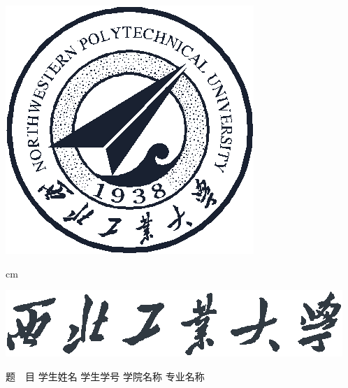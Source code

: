 \documentclass[a4paper,11pt]{ctexart}
\theoremstyle{break}
\theoremstyle{plain}
\begin{document}

\graphicspath{{result_figure/}}	
	
%
%
\begin{titlepage}
	\voffset 2.0cm
	\begin{center}
		\begin{center}
			\begin{minipage}[c]{2.64cm}
				\centering
				\includegraphics[width=1.64 cm]{logo1.png}
			\end{minipage}
			 cm
			\begin{minipage}[c]{8cm}
				\includegraphics[scale=0.6]{logo2.png}
			\end{minipage}
		\end{center}
		\vskip 0.8cm
		\chuhao{}
		\vskip 3cm
		{
			\sanhao\hei 题~~目 \hspace{0.2cm}
		}
		\vskip 2cm
		{
			\sihao\song 学生姓名
			\vskip 0.7cm
			\sihao\song 学生学号
			\vskip 0.7cm
			\sihao\song 学院名称
			\vskip 0.7cm
			\sihao\song 专业名称
			\vfill
		}
	\end{center}
\end{titlepage}
\end{document}
